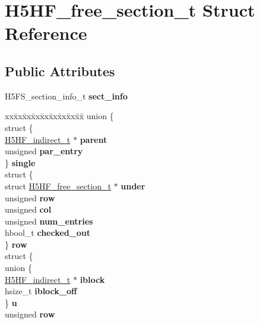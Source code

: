 \hypertarget{struct_h5_h_f__free__section__t}{}\section{H5\+H\+F\+\_\+free\+\_\+section\+\_\+t Struct Reference}
\label{struct_h5_h_f__free__section__t}
\subsection*{Public Attributes}
\begin{DoxyCompactItemize}
\item 
\mbox{\label{struct_h5_h_f__free__section__t_a4930d51646817e1eef3d44bb1e63db9a}} 
H5\+F\+S\+\_\+section\+\_\+info\+\_\+t {\bfseries sect\+\_\+info}
\item 
\mbox{\label{struct_h5_h_f__free__section__t_a69eb4dc3dc1e92f97a18caabbdebd1a1}} 
\begin{tabbing}
xx\=xx\=xx\=xx\=xx\=xx\=xx\=xx\=xx\=\kill
union \{\\
\>struct \{\\
\>\>\hyperlink{struct_h5_h_f__indirect__t}{H5HF\_indirect\_t} $\ast$ {\bfseries parent}\\
\>\>unsigned {\bfseries par\_entry}\\
\>\} {\bfseries single}\\
\>struct \{\\
\>\>struct \hyperlink{struct_h5_h_f__free__section__t}{H5HF\_free\_section\_t} $\ast$ {\bfseries under}\\
\>\>unsigned {\bfseries row}\\
\>\>unsigned {\bfseries col}\\
\>\>unsigned {\bfseries num\_entries}\\
\>\>hbool\_t {\bfseries checked\_out}\\
\>\} {\bfseries row}\\
\>struct \{\\
\>\>union \{\\
\>\>\>\hyperlink{struct_h5_h_f__indirect__t}{H5HF\_indirect\_t} $\ast$ {\bfseries iblock}\\
\>\>\>hsize\_t {\bfseries iblock\_off}\\
\>\>\} {\bfseries u}\\
\>\>unsigned {\bfseries row}\\

\end{tabbing}
\end{DoxyCompactItemize}
